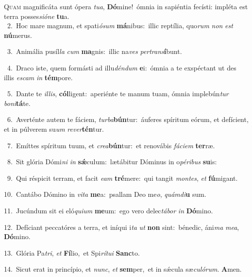 \lettrine{\initial\textcolor{\initialcolor}{Q}}{uam} magnificáta sunt ópera \textit{tu}\-\textit{a}, \textbf{Dó}\-mine!~\star ómnia in sapiéntia fecísti: impléta est terra posses\-\textit{si}\-\textit{ó}\textit{ne} \textbf{tu}\-a.\\
{\numbfont\textcolor{\numbcolor}{~2.}}~Hoc mare magnum, et spati\-\textit{ó}\-\textit{sum} \textbf{má}\-nibus:~\star illic reptília, quo\textit{rum} \textit{non} \textit{est} \textbf{nú}\-merus.\par
{\numbfont\textcolor{\numbcolor}{~3.}}~Animália pusíl\textit{la} \textit{cum} \textbf{ma}\-gnis:~\star illic na\textit{ves} \textit{per}\-\textit{trans}\textbf{í}bunt.\par
{\numbfont\textcolor{\numbcolor}{~4.}}~Draco iste, quem formásti ad illu\-\textit{dén}\-\textit{dum} \textbf{e}\-i:~\star ómnia a te exspéctant ut des illis \textit{es}\-\textit{cam} \textit{in} \textbf{tém}\-pore.\par
{\numbfont\textcolor{\numbcolor}{~5.}}~Dante te \textit{il}\-\textit{lis}, \textbf{cól}\-ligent:~\star aperiénte te manum tuam, ómnia implebún\textit{tur} \textit{bo}\-\textit{ni}\textbf{tá}te.\par
{\numbfont\textcolor{\numbcolor}{~6.}}~Averténte autem te fáciem, \textit{tur}\-\textit{ba}\textbf{bún}tur:~\star áuferes spíritum eórum, et defícient, et in púlverem su\textit{um} \textit{re}\-\textit{ver}\textbf{tén}tur.\par
{\numbfont\textcolor{\numbcolor}{~7.}}~Emíttes spíritum tuum, et \textit{cre}\-\textit{a}\textbf{bún}tur:~\star et renovábis \textit{fá}\-\textit{ci}\textit{em} \textbf{ter}\-ræ.\par
{\numbfont\textcolor{\numbcolor}{~8.}}~Sit glória Dómi\textit{ni} \textit{in} \textbf{sǽ}\-culum:~\star lætábitur Dóminus in o\-\textit{pé}\-\textit{ri}\textit{bus} \textbf{su}\-is:\par
{\numbfont\textcolor{\numbcolor}{~9.}}~Qui réspicit terram, et facit \textit{e}\-\textit{am} \textbf{tré}\-mere:~\star qui tangit \textit{mon}\-\textit{tes}, \textit{et} \textbf{fú}\-migant.\par
{\numbfont\textcolor{\numbcolor}{10.}}~Cantábo Dómino in \textit{vi}\-\textit{ta} \textbf{me}\-a:~\star psallam Deo me\-\textit{o}\-, \textit{quám}\-\textit{di}\textbf{u} sum.\par
{\numbfont\textcolor{\numbcolor}{11.}}~Jucúndum sit ei eló\-\textit{qui}\-\textit{um} \textbf{me}\-um:~\star ego vero delec\-\textit{tá}\-\textit{bor} \textit{in} \textbf{Dó}\-mino.\par
{\numbfont\textcolor{\numbcolor}{12.}}~Defíciant peccatóres a terra, et iníqui i\textit{ta} \textit{ut} \textbf{non} sint:~\star bénedic, áni\textit{ma} \textit{me}\-\textit{a}, \textbf{Dó}\-mino.\par
{\numbfont\textcolor{\numbcolor}{13.}}~Glória Pa\-\textit{tri}\-, \textit{et} \textbf{Fí}\-lio,~\star et Spi\-\textit{rí}\-\textit{tu}\textit{i} \textbf{Sanc}\-to.\par
{\numbfont\textcolor{\numbcolor}{14.}}~Sicut erat in princípio, et \textit{nunc}\-, \textit{et} \textbf{sem}\-per,~\star et in sǽcula sæ\-\textit{cu}\-\textit{ló}\textit{rum}. \textbf{A}\-men.\par
